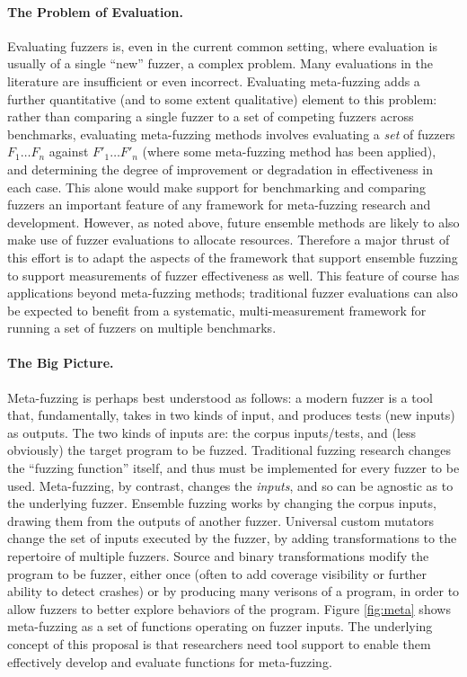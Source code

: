 \paragraph{The Problem of Evaluation.} Evaluating fuzzers is, even in the 
current common setting, where evaluation is usually of a single ``new'' fuzzer, 
a complex problem. Many evaluations in the literature are insufficient or even 
incorrect.  Evaluating meta-fuzzing adds a further quantitative (and to some 
extent qualitative) element to this problem: rather than comparing a single 
fuzzer to a set of competing fuzzers across benchmarks, evaluating meta-fuzzing 
methods involves evaluating a \emph{set} of fuzzers $F_1 \ldots F_n$ against 
$F'_1 \ldots F'_n$ (where some meta-fuzzing method has been applied), and 
determining the degree of improvement or degradation in effectiveness in each 
case.  This alone would make support for benchmarking and comparing fuzzers an 
important feature of any framework for meta-fuzzing research and development.  
However, as noted above, future ensemble methods are likely to also make use of 
fuzzer evaluations to allocate resources.  Therefore a major thrust of this 
effort is to adapt the aspects of the framework that support ensemble fuzzing 
to support measurements of fuzzer effectiveness as well.  This feature of 
course has applications beyond meta-fuzzing methods; traditional fuzzer 
evaluations can also be expected to benefit from a systematic, 
multi-measurement framework for running a set of fuzzers on multiple
benchmarks.

\paragraph{The Big Picture.}  Meta-fuzzing is perhaps best understood
as follows: a modern fuzzer is a tool that, fundamentally, takes in
two kinds of input, and produces tests (new inputs) as outputs.  The
two kinds of inputs are:  the corpus inputs/tests, and (less
obviously) the target program to be fuzzed.
Traditional fuzzing research changes the ``fuzzing function''
itself, and thus must be implemented for every fuzzer to be
used. Meta-fuzzing, by contrast, changes the \emph{inputs}, and so can
be agnostic as to the underlying fuzzer.   Ensemble fuzzing works by
changing the corpus inputs, drawing them from the outputs of another
fuzzer.  Universal custom mutators change the set of
inputs executed by the fuzzer, by adding transformations to the
repertoire of multiple fuzzers.  Source and binary transformations
modify the program to be fuzzer, either once (often to add coverage
visibility or further ability to detect crashes) or by producing many
verisons of a program, in order to allow fuzzers to better explore
behaviors of the program.  Figure \ref{fig:meta} shows meta-fuzzing as
a set of functions operating on fuzzer inputs.  The underlying concept
of this proposal is that researchers need tool support to enable them
effectively develop and evaluate functions for meta-fuzzing.

